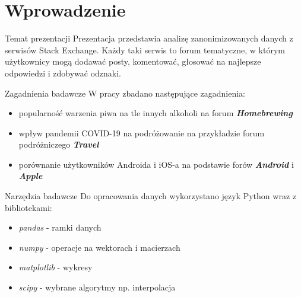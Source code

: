 \documentclass[./main.tex]{subfiles}
\begin{document}
\section{Wprowadzenie}

\begin{frame}{Temat prezentacji}
    Prezentacja przedstawia analizę zanonimizowanych danych z serwisów Stack Exchange. Każdy taki serwis to forum tematyczne, w którym użytkownicy mogą dodawać posty, komentować, głosować na najlepsze odpowiedzi i zdobywać odznaki.
    
\end{frame}

\begin{frame}{Zagadnienia badawcze}
    W pracy zbadano następujące zagadnienia: 
    
    \begin{itemize}
        \item popularność warzenia piwa na tle innych alkoholi na forum \textbf{\textit{Homebrewing}} \pause
        \item wpływ pandemii COVID-19 na podróżowanie na przykładzie forum podróżniczego \textbf{\textit{Travel}} \pause  
        \item porównanie użytkowników Androida i iOS-a na podstawie forów \textbf{\textit{Android}} i \textbf{\textit{Apple}}
    \end{itemize}
\end{frame}


\begin{frame}{Narzędzia badawcze}
    Do opracowania danych wykorzystano język Python wraz z bibliotekami:
    \begin{itemize}
        \item \textit{pandas} - ramki danych
        \item \textit{numpy} - operacje na wektorach i macierzach
        \item \textit{matplotlib} - wykresy
        \item \textit{scipy} - wybrane algorytmy np. interpolacja
    \end{itemize}
\end{frame}
\end{document}
